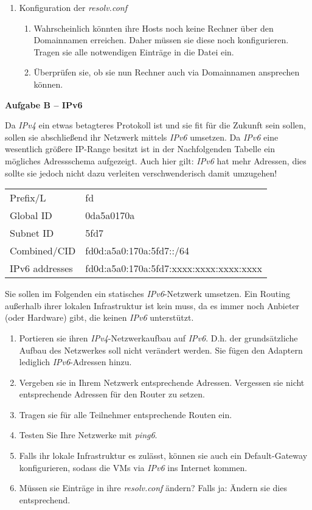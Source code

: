\documentclass[paper=a4,fontsize=11pt]{scrartcl}%
\begin{document}
\begin{enumerate}
\begin{enumerate}
\begin{enumerate}
     	\end{enumerate}
	\end{enumerate}
	\item Konfiguration der \emph{resolv.conf}
	\begin{enumerate}
		\item Wahrscheinlich könnten ihre Hosts noch keine Rechner über den Domainnamen erreichen. Daher müssen sie diese noch konfigurieren. Tragen sie alle notwendigen Einträge in die Datei  ein.
		\item Überprüfen sie, ob sie nun Rechner auch via Domainnamen ansprechen können.
	\end{enumerate}
\end{enumerate}

\begin{center}\Large{\textbf{Aufgabe B -- IPv6}}\end{center}\vskip0.25in
Da \emph{IPv4} ein etwas betagteres Protokoll ist und sie fit für die Zukunft sein sollen, sollen sie abschließend ihr Netzwerk mittels \emph{IPv6} umsetzen. Da \emph{IPv6} eine wesentlich größere IP-Range besitzt ist in der Nachfolgenden Tabelle ein mögliches Adressschema aufgezeigt. Auch hier gilt: \emph{IPv6} hat mehr Adressen, dies sollte sie jedoch nicht dazu verleiten verschwenderisch damit umzugehen!
\begin{table}[H]
\centering
\begin{tabular}{ll}
 Prefix/L & fd  \\
 Global ID & 0da5a0170a \\
 Subnet ID &  5fd7\\
 Combined/CID & fd0d:a5a0:170a:5fd7::/64 \\
 IPv6 addresses & fd0d:a5a0:170a:5fd7:xxxx:xxxx:xxxx:xxxx 
\end{tabular}
\end{table}
Sie sollen im Folgenden ein statisches \emph{IPv6}-Netzwerk umsetzen. Ein Routing außerhalb ihrer lokalen Infrastruktur ist kein muss, da es immer noch Anbieter (oder Hardware) gibt, die keinen \emph{IPv6} unterstützt.
\begin{enumerate}
	\item Portieren sie ihren \emph{IPv4}-Netzwerkaufbau auf \emph{IPv6}. D.h. der grundsätzliche Aufbau des Netzwerkes soll nicht verändert werden. Sie fügen den Adaptern lediglich \emph{IPv6}-Adressen hinzu.
	\item Vergeben sie in Ihrem Netzwerk entsprechende Adressen. Vergessen sie nicht entsprechende Adressen für den Router zu setzen.
	\item Tragen sie für alle Teilnehmer entsprechende Routen ein.
	\item Testen Sie Ihre Netzwerke mit \emph{ping6}.
	\item Falls ihr lokale Infrastruktur es zulässt, können sie auch ein Default-Gateway konfigurieren, sodass die VMs via \emph{IPv6} ins Internet kommen.
	\item Müssen sie Einträge in ihre \emph{resolv.conf} ändern? Falls ja: Ändern sie dies entsprechend.
\end{enumerate}
\end{document}
